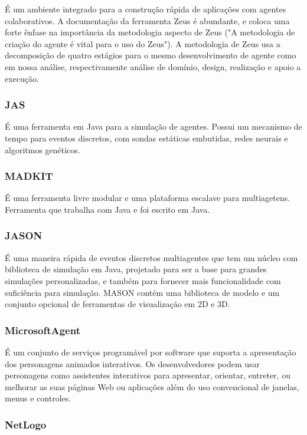 É um ambiente integrado para a construção rápida de aplicações com agentes colaborativos. A documentação da ferramenta Zeus é abundante, e coloca uma forte ênfase na importância da metodologia aspecto de Zeus ("A metodologia de criação do agente é vital para o uso do Zeus"). A metodologia de Zeus usa a decomposição de quatro estágios para o mesmo desenvolvimento de agente como em nossa análise, respectivamente análise de domínio, design, realização e apoio a execução.

\subsubsection*{JAS} 

É uma ferramenta em Java para a simulação de agentes. Possui um mecanismo de tempo para eventos discretos, com sondas estáticas embutidas, redes neurais e algoritmos genéticos.

 
\subsubsection*{MADKIT}

É uma ferramenta livre modular e uma plataforma escalave para multiagetens. Ferramenta que trabalha com Java e foi escrito em Java.   

 
\subsubsection*{JASON}

É uma maneira rápida de eventos discretos multiagentes que tem um núcleo com biblioteca de simulação em Java, projetado para ser a base para grandes simulações personalizadas, e também para fornecer mais funcionalidade com suficiência para simulação. MASON contém uma biblioteca de modelo e um conjunto opcional de ferramentas de visualização em 2D e 3D.

\subsubsection*{MicrosoftAgent}

É um conjunto de serviços programável por software que suporta a apresentação dos personagens animados interativos. Os desenvolvedores podem usar personagens como assistentes interativos para apresentar, orientar, entreter, ou melhorar as suas páginas Web ou aplicações além do uso convencional de janelas, menus e controles.

\subsubsection*{NetLogo}

